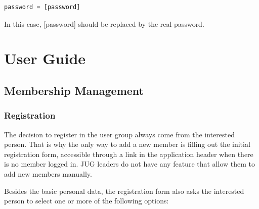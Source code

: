 \documentclass[envcountsame,envcountchap]{svmono}
\begin{document}
\begin{verbatim}
password = [password]
\end{verbatim}

In this case, [password] should be replaced by the real password.

\part{User Guide}

\chapter{Membership Management}

\section{Registration}

The decision to register in the user group always come from the interested person. That is why the only way to add a new member is filling out the initial registration form, accessible through a link in the application header when there is no member logged in. JUG leaders do not have any feature that allow them to add new members manually.

Besides the basic personal data, the registration form also asks the interested person to select one or more of the following options:
\end{document}
